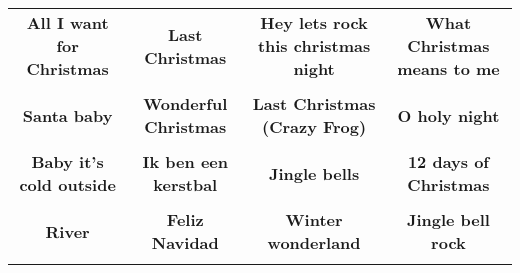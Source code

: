 \documentclass[12pt]{article} \usepackage{eso-pic, graphicx}
\newcommand{\background}[1]{%
\AddToShipoutPictureBG*{\texttt{[image: \#1]}}
}
\begin{document}
\tabcolsep=30.2pt \renewcommand{\arraystretch}{4.5}   \vspace*{4.3cm} \begin{center}  \begin{tabular}{c c c c}
\parbox{3cm}{\centering \textbf{All I want for Christmas}}& 
\parbox{3cm}{\centering \textbf{Last Christmas}}& 
\parbox{3cm}{\centering \textbf{Hey lets rock this christmas night}}& 
\parbox{3cm}{\centering \textbf{What Christmas means to me}}\\ \\ 
\parbox{3cm}{\centering \textbf{Santa baby}}& 
\parbox{3cm}{\centering \textbf{Wonderful Christmas}}& 
\parbox{3cm}{\centering \textbf{Last Christmas (Crazy Frog)}}& 
\parbox{3cm}{\centering \textbf{O holy night}}\\ \\ 
\parbox{3cm}{\centering \textbf{Baby it’s cold outside}}& 
\parbox{3cm}{\centering \textbf{Ik ben een kerstbal}}& 
\parbox{3cm}{\centering \textbf{Jingle bells}}& 
\parbox{3cm}{\centering \textbf{12 days of Christmas}}\\ \\ 
\parbox{3cm}{\centering \textbf{River}}& 
\parbox{3cm}{\centering \textbf{Feliz Navidad}}& 
\parbox{3cm}{\centering \textbf{Winter wonderland}}& 
\parbox{3cm}{\centering \textbf{Jingle bell rock}}\\ \\ 
\end{tabular} \background{discobingo.pdf} \end{center} 
\end{document}
